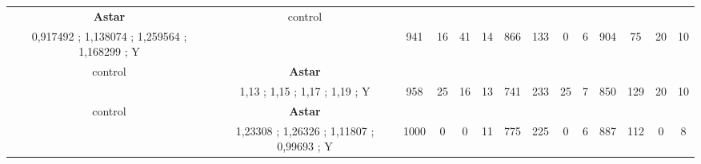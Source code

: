 \begin{table}[]
{\begin{tabular}{|c|c|c|c|c|c|c|c|c|c|c|c|c|c|}
\cellcolor{blue!15}\textbf{Astar} & control& {\color[HTML]{00009B} } & {\color[HTML]{9A0000} } & {\color[HTML]{009901} } &  & {\color[HTML]{00009B} } & {\color[HTML]{9A0000} } & {\color[HTML]{009901} } &  & {\color[HTML]{00009B} } & {\color[HTML]{9A0000} } & {\color[HTML]{009901} } &  \\ 
\cellcolor{ blue!15}0,917492 ; 1,138074 ; 1,259564 ; 1,168299 ; Y &  & \multirow{-2}{*}{{\color[HTML]{00009B} 941}} & \multirow{-2}{*}{{\color[HTML]{9A0000} 16}} & \multirow{-2}{*}{{\color[HTML]{009901} 41}} & \multirow{-2}{*}{14} & \multirow{-2}{*}{{\color[HTML]{00009B} 866}} & \multirow{-2}{*}{{\color[HTML]{9A0000} 133}} & \multirow{-2}{*}{{\color[HTML]{009901} 0}} & \multirow{-2}{*}{6} & \multirow{-2}{*}{{\color[HTML]{00009B} 904}} & \multirow{-2}{*}{{\color[HTML]{9A0000} 75}} & \multirow{-2}{*}{{\color[HTML]{009901} 20}} & \multirow{-2}{*}{10} \\ \hline

control & \cellcolor{blue!15}\textbf{Astar}& {\color[HTML]{00009B} } & {\color[HTML]{9A0000} } & {\color[HTML]{009901} } &  & {\color[HTML]{00009B} } & {\color[HTML]{9A0000} } & {\color[HTML]{009901} } &  & {\color[HTML]{00009B} } & {\color[HTML]{9A0000} } & {\color[HTML]{009901} } &  \\ 
 & \cellcolor{ blue!15}1,13 ; 1,15 ; 1,17 ; 1,19 ; Y & \multirow{-2}{*}{{\color[HTML]{00009B} 958}} & \multirow{-2}{*}{{\color[HTML]{9A0000} 25}} & \multirow{-2}{*}{{\color[HTML]{009901} 16}} & \multirow{-2}{*}{13} & \multirow{-2}{*}{{\color[HTML]{00009B} 741}} & \multirow{-2}{*}{{\color[HTML]{9A0000} 233}} & \multirow{-2}{*}{{\color[HTML]{009901} 25}} & \multirow{-2}{*}{7} & \multirow{-2}{*}{{\color[HTML]{00009B} 850}} & \multirow{-2}{*}{{\color[HTML]{9A0000} 129}} & \multirow{-2}{*}{{\color[HTML]{009901} 20}} & \multirow{-2}{*}{10} \\ \hline

control & \cellcolor{blue!15}\textbf{Astar}& {\color[HTML]{00009B} } & {\color[HTML]{9A0000} } & {\color[HTML]{009901} } &  & {\color[HTML]{00009B} } & {\color[HTML]{9A0000} } & {\color[HTML]{009901} } &  & {\color[HTML]{00009B} } & {\color[HTML]{9A0000} } & {\color[HTML]{009901} } &  \\ 
 & \cellcolor{ blue!15}1,23308 ; 1,26326 ; 1,11807 ; 0,99693 ; Y & \multirow{-2}{*}{{\color[HTML]{00009B} 1000}} & \multirow{-2}{*}{{\color[HTML]{9A0000} 0}} & \multirow{-2}{*}{{\color[HTML]{009901} 0}} & \multirow{-2}{*}{11} & \multirow{-2}{*}{{\color[HTML]{00009B} 775}} & \multirow{-2}{*}{{\color[HTML]{9A0000} 225}} & \multirow{-2}{*}{{\color[HTML]{009901} 0}} & \multirow{-2}{*}{6} & \multirow{-2}{*}{{\color[HTML]{00009B} 887}} & \multirow{-2}{*}{{\color[HTML]{9A0000} 112}} & \multirow{-2}{*}{{\color[HTML]{009901} 0}} & \multirow{-2}{*}{8} \\ \hline


\end{tabular}}
\end{table}
